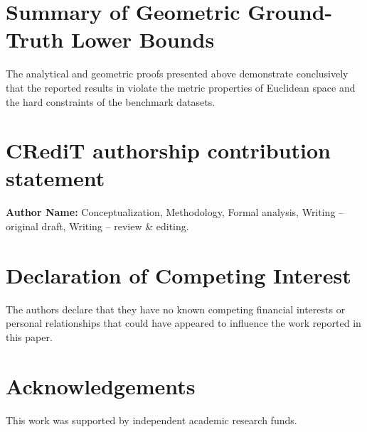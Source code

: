 \documentclass[review]{elsarticle}
\begin{document}
\section{Summary of Geometric Ground-Truth Lower Bounds}
\label{sec:summary_bounds}

\begin{table}[H]
\caption{Mathematical Comparison: Geometric Ground-Truth Lower Bounds vs. Published Paper Claims.}
\label{tab:geometric_summary}
\centering
{}
\end{table}

The analytical and geometric proofs presented above demonstrate conclusively that the reported results in \cite{nguyen2026phshowoa} violate the metric properties of Euclidean space and the hard constraints of the benchmark datasets.

\section*{CRediT authorship contribution statement}
\textbf{Author Name:} Conceptualization, Methodology, Formal analysis, Writing – original draft, Writing – review \& editing.

\section*{Declaration of Competing Interest}
The authors declare that they have no known competing financial interests or personal relationships that could have appeared to influence the work reported in this paper.

\section*{Acknowledgements}
This work was supported by independent academic research funds.


\end{document}

